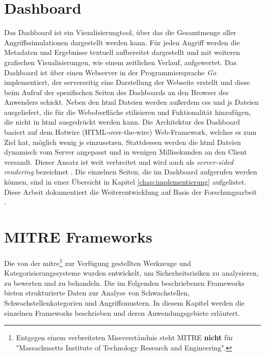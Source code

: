 \section{Dashboard}
\label{sec:tech-dashboard}
Das Dashboard ist ein Visualisierungtool, über das die Gesamtmenge aller Angriffssimulationen dargestellt werden kann. Für jeden Angriff werden die Metadaten und Ergebnisse textuell aufbereitet dargestellt und mit weiteren grafischen Visualisierungen, wie einem zeitlichen Verlauf, aufgewertet.
Das Dashboard ist über einen Webserver in der Programmiersprache \textit{Go} implementiert, der serverseitig eine Darstellung der Webseite erstellt und diese beim Aufruf der spezifischen Seiten des Dashboards an den Browser des Anwenders schickt. Neben den \gls{html} Dateien werden außerdem \gls{css} und \gls{js} Dateien ausgeliefert, die für die Weboberfläche stilisieren und Fuktionalität hinzufügen, die nicht in \gls{html} ausgedrückt werden kann. Die Architektur des Dashboard basiert auf dem Hotwire (HTML-over-the-wire) Web-Framework, welches es zum Ziel hat, möglich wenig \gls{js} einzusetzen. Stattdessen werden die \gls{html} Dateien dynamisch vom Server angepasst und in wenigen Millisekunden an den Client versandt. Dieser Ansatz ist weit verbreitet und wird auch als \textit{server-sided rendering} bezeichnet \autocite{HTMLWireHotwire}. Die einzelnen Seiten, die im Dashboard aufgerufen werden können, sind in einer Übersicht in Kapitel \ref{chap:implementierung} aufgelistet.
Diese Arbeit dokumentiert die Weiterentwicklung auf Basis der Forschungsarbeit \autocite{weberEvaluationDashboardTechniques}.

\label{bg:mitre-frameworks}
\section{MITRE Frameworks}
Die von der \gls{mitre}\footnote{Entgegen einem verbreiteten Missverständnis steht MITRE \textbf{nicht} für "Massachusetts Institute of Technology Research and Engineering".} zur Verfügung gestellten Werkzeuge und Kategorisierungssysteme wurden entwickelt, um Sicherheitsrisiken zu analysieren, zu bewerten und zu behandeln. Die im Folgenden beschriebenen Frameworks bieten strukturierte Daten zur Analyse von Schwachstellen, Schwachstellenkategorien und Angriffsmustern. In diesem Kapitel werden die einzelnen Frameworks beschrieben und deren Anwendungsgebiete erläutert.

